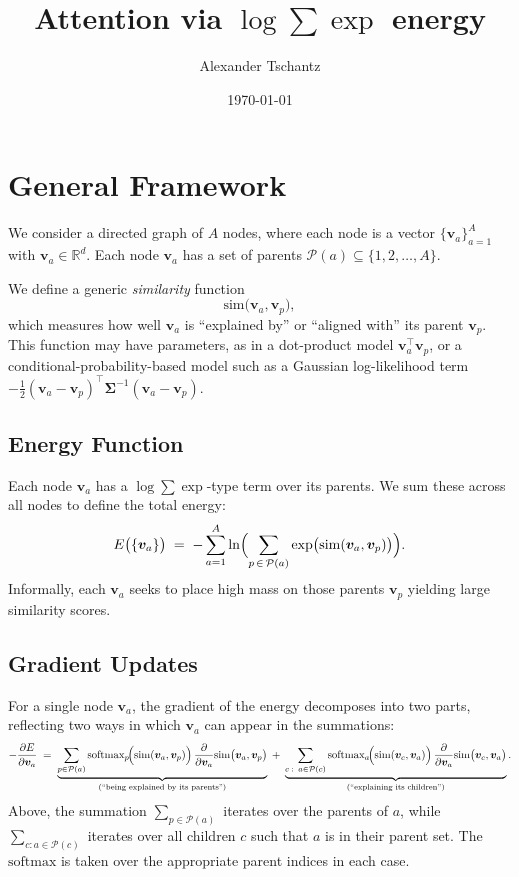 \documentclass{article}
\begin{document}
\title{Attention via \(\log \sum \exp\) energy}
\author{Alexander Tschantz}
\date{\today}
\maketitle

\section{General Framework}
We consider a directed graph of \(A\) nodes, where each node is a vector \(\{\bm{v}_a\}_{a=1}^A\) with \(\bm{v}_a \in \mathbb{R}^d\).  Each node \(\bm{v}_a\) has a set of parents \(\mathcal{P}(a) \subseteq \{1,2,\ldots,A\}\).  

We define a generic \emph{similarity} function
\[
\mathrm{sim}\bigl(\bm{v}_a,\bm{v}_p\bigr),
\]
which measures how well \(\bm{v}_a\) is ``explained by'' or ``aligned with'' its parent \(\bm{v}_p\). This function may have parameters, as in a dot-product model \(\bm{v}_a^\top \bm{v}_p\), or a conditional-probability-based model such as a Gaussian log-likelihood term \(-\tfrac12(\bm{v}_a-\bm{v}_p)^\top \bm{\Sigma}^{-1}(\bm{v}_a-\bm{v}_p)\). 

\subsection{Energy Function}
Each node \(\bm{v}_a\) has a \(\log\sum\exp\)-type term over its parents.  We sum these across all nodes to define the total energy:
\[
E\bigl(\{\bm{v}_a\}\bigr)
\;=\;
-\sum_{a=1}^A
\ln \Bigl(\sum_{p\,\in\,\mathcal{P}(a)}
\exp \bigl(\mathrm{sim}(\bm{v}_a,\bm{v}_p)\bigr)\Bigr).
\]
Informally, each \(\bm{v}_a\) seeks to place high mass on those parents \(\bm{v}_p\) yielding large similarity scores.

\subsection{Gradient Updates}
For a single node \(\bm{v}_a\), the gradient of the energy decomposes into two parts, reflecting two ways in which \(\bm{v}_a\) can appear in the summations:
\[
-\frac{\partial E}{\partial \bm{v}_a}
\;=\;
\underbrace{
\sum_{p \in \mathcal{P}(a)}
\text{softmax}_{p}\!\Bigl(\mathrm{sim}(\bm{v}_a,\bm{v}_p)\Bigr)\,
\frac{\partial}{\partial \bm{v}_a}
\mathrm{sim}\bigl(\bm{v}_a,\bm{v}_p\bigr)
}_{\text{(``being explained by its parents'')}}
\;+\;
\underbrace{
\sum_{c \,\colon\, a \in \mathcal{P}(c)}
\text{softmax}_{a}\!\Bigl(\mathrm{sim}(\bm{v}_c,\bm{v}_a)\Bigr)\,
\frac{\partial}{\partial \bm{v}_a}
\mathrm{sim}\bigl(\bm{v}_c,\bm{v}_a\bigr)
}_{\text{(``explaining its children'')}}.
\]
Above, the summation \(\sum_{p \in \mathcal{P}(a)}\) iterates over the parents of \(a\), while \(\sum_{c : a \in \mathcal{P}(c)}\) iterates over all children \(c\) such that \(a\) is in their parent set.  The \(\text{softmax}\) is taken over the appropriate parent indices in each case.
\end{document}
